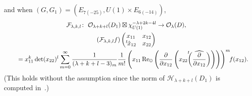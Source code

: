 \documentclass[pdftex]{sigma}
\numberwithin{equation}{section}
\newcommand{\BO}{\mathbb{O}}
\newcommand{\cF}{\mathcal{F}}
\newcommand{\cH}{\mathcal{H}}
\newcommand{\cO}{\mathcal{O}}
\renewcommand{\Re}{\operatorname{Re}}
\begin{document}
and when $(G,G_1)=(E_{7(-25)},U(1)\times E_{6(-14)})$,
\begin{gather*}
\cF_{\lambda,k,l}\colon \ \cO_{\lambda+k+l}(D_1)\boxtimes\chi_{U(1)}^{-\lambda+2k-4l}\to \cO_\lambda(D), \\
(\cF_{\lambda,k,l}f)\begin{pmatrix}x_{11}&x_{12}\\{}^t\hspace{-1pt}\hat{x}_{12}&x_{22}\end{pmatrix} \\
\qquad {} =x_{11}^k\det(x_{22})^l\sum_{m=0}^\infty \frac{1}{(\lambda+k+l-3)_m}
\frac{1}{m!}\left(x_{11}\Re_\BO\left(\frac{\partial}{\partial x_{12}}
\left(x_{22}{\vphantom{\biggl(}}^t\!\!\biggl(\widehat{\frac{\partial}{\partial x_{12}}}\biggr)\right)\right)\right)^m\!\!f(x_{12}).
\end{gather*}
(This holds without the assumption \cite[Conjecture 5.11]{N2} since the norm of $\cH_{\lambda+k+l}(D_1)$ is computed in~\cite{FK0}.)
\end{document}
